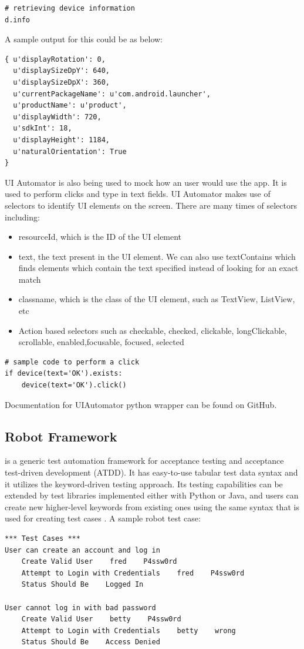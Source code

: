 \begin{lstlisting}[style=PyStyle]
# retrieving device information
d.info 
\end{lstlisting}

A sample output for this could be as below:
\begin{lstlisting}[style=PyStyle]
{ u'displayRotation': 0,
  u'displaySizeDpY': 640,
  u'displaySizeDpX': 360,
  u'currentPackageName': u'com.android.launcher',
  u'productName': u'product',
  u'displayWidth': 720,
  u'sdkInt': 18,
  u'displayHeight': 1184,
  u'naturalOrientation': True
}
\end{lstlisting}

UI Automator is also being used to mock how an user would use the app. It is used to perform clicks and type in text fields. UI Automator makes use of selectors to identify UI elements on the screen. There are many times of selectors including:
\begin{itemize}
	\item resourceId, which is the ID of the UI element
	\item text, the text present in the UI element. We can also use textContains which finds elements which contain the text specified instead of looking for an exact match
	\item classname, which is the class of the UI element, such as TextView, ListView, etc
	\item Action based selectors such as checkable, checked, clickable, longClickable, scrollable, enabled,focusable, focused, selected
\end{itemize}
\begin{lstlisting}[style=PyStyle]
# sample code to perform a click
if device(text='OK').exists:
    device(text='OK').click()
\end{lstlisting}
Documentation for UIAutomator python wrapper can be found on GitHub. \cite{uiautomatordoc}\\

\subsection{Robot Framework} is a generic test automation framework for acceptance testing and acceptance test-driven development (ATDD). It has easy-to-use tabular test data syntax and it utilizes the keyword-driven testing approach. Its testing capabilities can be extended by test libraries implemented either with Python or Java, and users can create new higher-level keywords from existing ones using the same syntax that is used for creating test cases \cite{robot}.
A sample robot test case:
\begin{lstlisting}[style=PyStyle]
*** Test Cases ***
User can create an account and log in
    Create Valid User    fred    P4ssw0rd
    Attempt to Login with Credentials    fred    P4ssw0rd
    Status Should Be    Logged In

User cannot log in with bad password
    Create Valid User    betty    P4ssw0rd
    Attempt to Login with Credentials    betty    wrong
    Status Should Be    Access Denied
\end{lstlisting}

